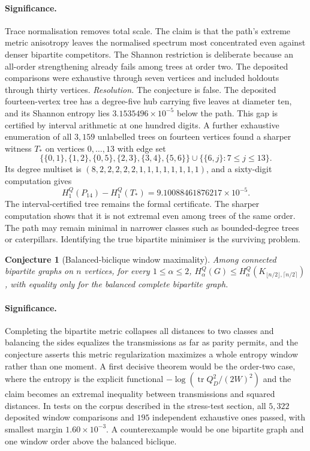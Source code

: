 \documentclass[11pt]{article}
\newtheorem{conjecture}{Conjecture}
\theoremstyle{definition}
\begin{document}
\paragraph{Significance.}
Trace normalisation removes total scale.  The claim is that the path's extreme metric anisotropy leaves the normalised spectrum most concentrated even against denser bipartite competitors.  The Shannon restriction is deliberate because an all-order strengthening already fails among trees at order two.  The deposited comparisons were exhaustive through seven vertices and included holdouts through thirty vertices.  \emph{Resolution.}  The conjecture is false.  The deposited fourteen-vertex tree has a degree-five hub carrying five leaves at diameter ten, and its Shannon entropy lies $3.1535496\times10^{-5}$ below the path.  This gap is certified by interval arithmetic at one hundred digits.  A further exhaustive enumeration of all $3{,}159$ unlabelled trees on fourteen vertices found a sharper witness $T_*$ on vertices $0,\ldots,13$ with edge set
\[
\bigl\{\{0,1\},\{1,2\},\{0,5\},\{2,3\},\{3,4\},\{5,6\}\bigr\}
\mathbin{\cup}\bigl\{\{6,j\}:7\le j\le13\bigr\}.
\]
Its degree multiset is $(8,2,2,2,2,2,1,1,1,1,1,1,1,1)$, and a sixty-digit computation gives
\[
H^Q_1(P_{14})-H^Q_1(T_*)=9.10088461876217\times10^{-5}.
\]
The interval-certified tree remains the formal certificate.  The sharper computation shows that it is not extremal even among trees of the same order.  The path may remain minimal in narrower classes such as bounded-degree trees or caterpillars.  Identifying the true bipartite minimiser is the surviving problem.

\begin{conjecture}[Balanced-biclique window maximality]\label{ab10}
Among connected bipartite graphs on $n$ vertices, for every $1\le\alpha\le2$, $H^Q_\alpha(G)\le H^Q_\alpha(K_{\lfloor n/2\rfloor,\lceil n/2\rceil})$, with equality only for the balanced complete bipartite graph.
\end{conjecture}

\paragraph{Significance.}
Completing the bipartite metric collapses all distances to two classes and balancing the sides equalizes the transmissions as far as parity permits, and the conjecture asserts this metric regularization maximizes a whole entropy window rather than one moment.  A first decisive theorem would be the order-two case, where the entropy is the explicit functional $-\log(\operatorname{tr}Q_D^2/(2W)^2)$ and the claim becomes an extremal inequality between transmissions and squared distances.  In tests on the corpus described in the stress-test section, all $5{,}322$ deposited window comparisons and $195$ independent exhaustive ones passed, with smallest margin $1.60\times10^{-3}$.  A counterexample would be one bipartite graph and one window order above the balanced biclique.
\end{document}
